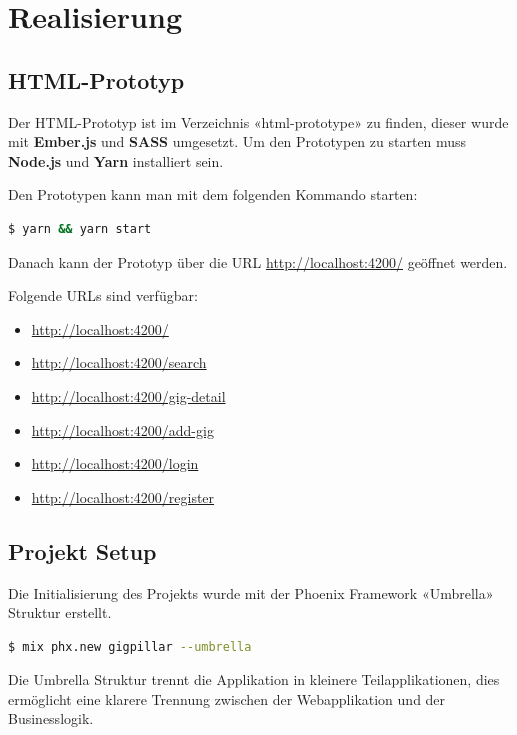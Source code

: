 \chapter{Realisierung}\label{AppendixRealisierung}

\section{HTML-Prototyp}

Der HTML-Prototyp ist im Verzeichnis «html-prototype» zu finden, dieser wurde
mit \textbf{Ember.js} und \textbf{SASS} umgesetzt.
Um den Prototypen zu starten muss \textbf{Node.js} und \textbf{Yarn} installiert sein.

\noindent
Den Prototypen kann man mit dem folgenden Kommando starten:

\begin{lstlisting}[language=bash,frame=single]
$ yarn && yarn start
\end{lstlisting}

\noindent
Danach kann der Prototyp über die URL \url{http://localhost:4200/} geöffnet werden.

\noindent
Folgende URLs sind verfügbar:

\begin{itemize}
  \tightlist{}
  \item{} \url{http://localhost:4200/}
  \item{} \url{http://localhost:4200/search}
  \item{} \url{http://localhost:4200/gig-detail}
  \item{} \url{http://localhost:4200/add-gig}
  \item{} \url{http://localhost:4200/login}
  \item{} \url{http://localhost:4200/register}
\end{itemize}

\clearpage
\section{Projekt Setup}

Die Initialisierung des Projekts wurde mit der Phoenix Framework «Umbrella»
Struktur erstellt.

\begin{lstlisting}[language=bash,frame=single]
$ mix phx.new gigpillar --umbrella
\end{lstlisting}

Die Umbrella Struktur trennt die Applikation in kleinere Teilapplikationen,
dies ermöglicht eine klarere Trennung zwischen der Webapplikation und der Businesslogik.

